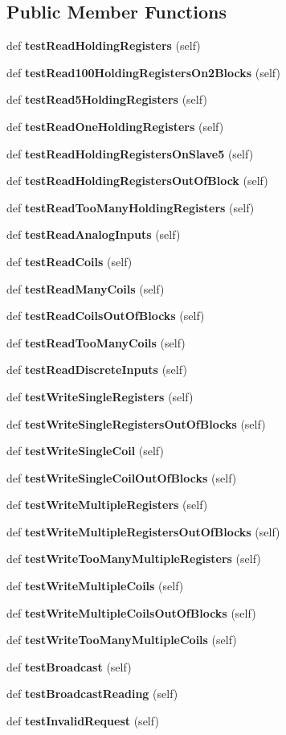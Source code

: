\subsection*{Public Member Functions}
\begin{DoxyCompactItemize}
\item 
def {\bf test\+Read\+Holding\+Registers} (self)
\item 
def {\bf test\+Read100\+Holding\+Registers\+On2\+Blocks} (self)
\item 
def {\bf test\+Read5\+Holding\+Registers} (self)
\item 
def {\bf test\+Read\+One\+Holding\+Registers} (self)
\item 
def {\bf test\+Read\+Holding\+Registers\+On\+Slave5} (self)
\item 
def {\bf test\+Read\+Holding\+Registers\+Out\+Of\+Block} (self)
\item 
def {\bf test\+Read\+Too\+Many\+Holding\+Registers} (self)
\item 
def {\bf test\+Read\+Analog\+Inputs} (self)
\item 
def {\bf test\+Read\+Coils} (self)
\item 
def {\bf test\+Read\+Many\+Coils} (self)
\item 
def {\bf test\+Read\+Coils\+Out\+Of\+Blocks} (self)
\item 
def {\bf test\+Read\+Too\+Many\+Coils} (self)
\item 
def {\bf test\+Read\+Discrete\+Inputs} (self)
\item 
def {\bf test\+Write\+Single\+Registers} (self)
\item 
def {\bf test\+Write\+Single\+Registers\+Out\+Of\+Blocks} (self)
\item 
def {\bf test\+Write\+Single\+Coil} (self)
\item 
def {\bf test\+Write\+Single\+Coil\+Out\+Of\+Blocks} (self)
\item 
def {\bf test\+Write\+Multiple\+Registers} (self)
\item 
def {\bf test\+Write\+Multiple\+Registers\+Out\+Of\+Blocks} (self)
\item 
def {\bf test\+Write\+Too\+Many\+Multiple\+Registers} (self)
\item 
def {\bf test\+Write\+Multiple\+Coils} (self)
\item 
def {\bf test\+Write\+Multiple\+Coils\+Out\+Of\+Blocks} (self)
\item 
def {\bf test\+Write\+Too\+Many\+Multiple\+Coils} (self)
\item 
def {\bf test\+Broadcast} (self)
\item 
def {\bf test\+Broadcast\+Reading} (self)
\item 
def {\bf test\+Invalid\+Request} (self)
\end{DoxyCompactItemize}
